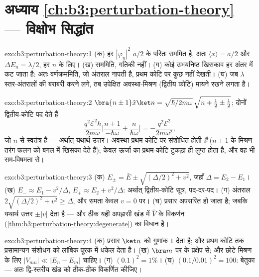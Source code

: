 \section*{अध्याय \ref{ch:b3:perturbation-theory} --- विक्षोभ सिद्धांत}

\begin{solution}{exo:b3:perturbation-theory:1}
(क) हर $|\varphi_n|^2$ $a/2$ के परितः सममित है, अतः $\langle
x\rangle = a/2$ और $\Delta E_n = \lambda/2$, हर $n$ के लिए। (ख)
सममिति, गतिकी नहीं। (ग) कोई उभयनिष्ठ खिसकाव हर
अंतर में कट जाता है: अतः वर्णक्रममिति, जो अंतराल नापती है, प्रथम कोटि
पर कुछ नहीं देखती। (घ) जब $\lambda$ स्तर-अंतरालों की बराबरी करने लगे, तब
उपेक्षित अवस्था-मिश्रण (द्वितीय कोटि) मायने रखने लगता है।
\end{solution}

\begin{solution}{exo:b3:perturbation-theory:2}
$\bra{n\pm1}\hat x\ket n = \sqrt{\hbar/2m\omega}\,\sqrt{n + \tfrac12
\pm \tfrac12}$; दोनों द्वितीय-कोटि पद देते हैं
\[
\frac{q^2\mathcal E^2\hbar}{2m\omega}\Big[\frac{n+1}{-\hbar\omega}
+ \frac{n}{\hbar\omega}\Big] = -\frac{q^2\mathcal E^2}{2m\omega^2} ,
\]
जो $n$ से स्वतंत्र है --- अर्थात् यथार्थ उत्तर। अवस्था प्रथम कोटि पर
संशोधित होती \emph{है} ($n \pm 1$ के मिश्रण तरंग फलन को बगल में खिसका
देते हैं); केवल ऊर्जा का प्रथम-कोटि टुकड़ा ही लुप्त होता है, और वह भी
सम-विषमता से।
\end{solution}

\begin{solution}{exo:b3:perturbation-theory:3}
(क) $E_\pm = \bar E \pm \sqrt{(\Delta/2)^2 + v^2}$, जहाँ $\Delta =
E_2 - E_1$। (ख) $E_- \approx E_1 - v^2/\Delta$, $E_+ \approx E_2 +
v^2/\Delta$: अर्थात् द्वितीय-कोटि सूत्र, पद-दर-पद। (ग) अंतराल
$2\sqrt{(\Delta/2)^2 + v^2} \ge \Delta$, और समता केवल $v =
0$ पर। (घ) प्रसार अपसरित हो जाता है; जबकि यथार्थ उत्तर $\pm|v|$ देता है ---
और ठीक यही अपह्रासी खंड में $\hat V$ के विकर्णन
(\cref{thm:b3:perturbation-theory:degenerate}) का विधान है।
\end{solution}

\begin{solution}{exo:b3:perturbation-theory:4}
(क) प्रसार $\ket n$ को गुणांक $1$ देता है; और प्रथम कोटि तक प्रसामान्यन
संशोधन को लांबिक पूरक में धकेल देता है। (ख) $\bra m$ पर के प्रक्षेप से;
और छोटे मिश्रण के लिए $|V_{mn}| \ll |E_n - E_m|$ चाहिए। (ग) $(0.1)^2 = 1\%$। (घ)
$(0.1/0.01)^2 = 100$: बेतुका --- अतः द्वि-स्तरीय खंड को
ठीक-ठीक विकर्णित कीजिए।
\end{solution}

